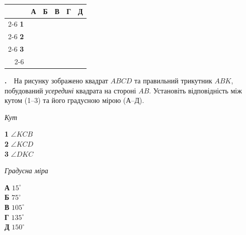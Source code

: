 \documentclass[12pt]{article}
\newcommand{\matchingGrid}{%
    \begingroup
    \renewcommand{\arraystretch}{1.15}
    \setlength{\tabcolsep}{4pt}
    \footnotesize
    \begin{tabular}{r|c|c|c|c|c|}
         \multicolumn{1}{c}{} & \multicolumn{1}{c}{\textbf{А}} & \multicolumn{1}{c}{\textbf{Б}} & \multicolumn{1}{c}{\textbf{В}} & \multicolumn{1}{c}{\textbf{Г}} & \multicolumn{1}{c}{\textbf{Д}} \\ \cline{2-6}
         \textbf{1} & \phantom{X} & \phantom{X} & \phantom{X} & \phantom{X} & \phantom{X} \\ \cline{2-6}
         \textbf{2} & & & & & \\ \cline{2-6}
         \textbf{3} & & & & & \\ \cline{2-6}
    \end{tabular}
    \endgroup
}
\newcounter{zad}
\newcommand{\zadnum}{\stepcounter{zad}\textbf{\thezad.}\ \ }
\begin{document}
\hfill
\begin{minipage}[t]{0.2\textwidth}
\vspace{0.5cm}
\begin{flushright}\matchingGrid\end{flushright}
\end{minipage}
\par\vspace{0.5cm}
\zadnum На рисунку зображено квадрат $ABCD$ та правильний трикутник $ABK$, побудований \textit{усередині} квадрата на стороні $AB$. Установіть відповідність між кутом (1--3) та його градусною мірою (А--Д).
\vspace{0.3cm}
\begin{center}
\end{center}
\vspace{0.2cm}
\noindent
\begin{minipage}[t]{0.32\textwidth}
\textit{Кут}\par\vspace{0.2cm}
\textbf{1} \quad $\angle KCB$\\[0.25cm]
\textbf{2} \quad $\angle KCD$\\[0.25cm]
\textbf{3} \quad $\angle DKC$
\end{minipage}
\hfill
\begin{minipage}[t]{0.34\textwidth}
\textit{Градусна міра}\par\vspace{0.2cm}
\textbf{А} \quad $15^\circ$\\[0.15cm]
\textbf{Б} \quad $75^\circ$\\[0.15cm]
\textbf{В} \quad $105^\circ$\\[0.15cm]
\textbf{Г} \quad $135^\circ$\\[0.15cm]
\textbf{Д} \quad $150^\circ$
\end{minipage}
\hfill
\end{document}

